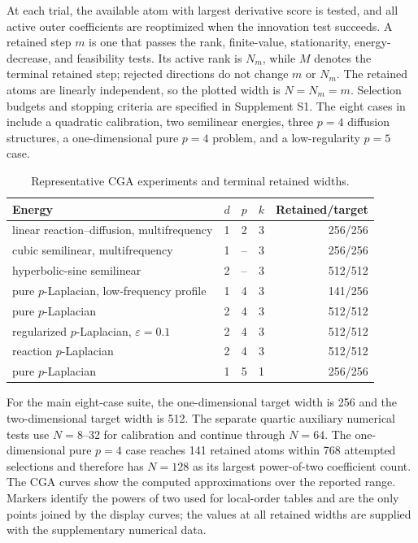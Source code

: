 At each trial, the available atom with largest derivative score is tested, and all active outer
coefficients are reoptimized when the innovation test succeeds. A retained step \(m\) is one that passes
the rank, finite-value, stationarity, energy-decrease, and feasibility tests. Its active rank is
\(N_m\), while \(M\) denotes the terminal retained step; rejected directions do not
change \(m\) or \(N_m\). The retained atoms are linearly independent, so the
plotted width is \(N=N_m=m\). Selection budgets and stopping criteria are specified
in Supplement S1. The eight cases in  include a
quadratic calibration, two semilinear energies, three \(p=4\) diffusion structures, a
one-dimensional pure \(p=4\) problem, and a low-regularity \(p=5\) case.

\begin{table}[!htbp]
\centering
\small
\caption{Representative CGA experiments and terminal retained widths.}
\label{tab:cases}
\begin{tabular}{@{}lcccr@{}}
\toprule
Energy & \(d\) & \(p\) & \(k\) & Retained/target \\
\midrule
linear reaction--diffusion, multifrequency & 1 & 2 & 3 & 256/256 \\
cubic semilinear, multifrequency & 1 & -- & 3 & 256/256 \\
hyperbolic-sine semilinear & 2 & -- & 3 & 512/512 \\
pure \(p\)-Laplacian, low-frequency profile & 1 & 4 & 3 & 141/256 \\
pure \(p\)-Laplacian & 2 & 4 & 3 & 512/512 \\
regularized \(p\)-Laplacian, \(\varepsilon=0.1\) & 2 & 4 & 3 & 512/512 \\
reaction \(p\)-Laplacian & 2 & 4 & 3 & 512/512 \\
pure \(p\)-Laplacian & 1 & 5 & 1 & 256/256 \\
\bottomrule
\end{tabular}
\end{table}

For the main eight-case suite, the one-dimensional target width is 256 and the
two-dimensional target width is 512. The separate quartic auxiliary numerical tests use
\(N=8\)--32 for calibration and continue through \(N=64\). The
one-dimensional pure \(p=4\) case reaches 141 retained atoms within 768 attempted selections and
therefore has \(N=128\) as its largest power-of-two coefficient count.
The CGA curves show the computed approximations over the reported range. Markers identify the
powers of two used for local-order tables and are the only points joined by the display curves; the
values at all retained widths are supplied with the supplementary numerical data.

